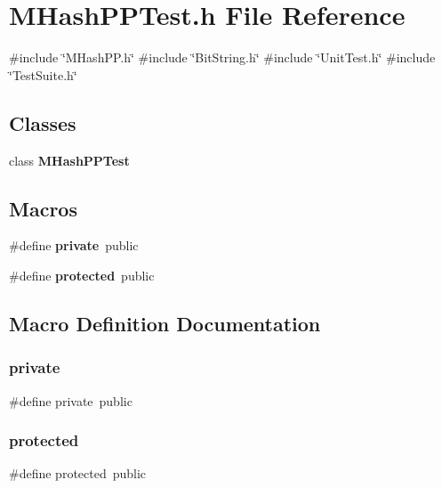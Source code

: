 \section{M\+Hash\+P\+P\+Test.\+h File Reference}
\label{MHashPPTest_8h}
{\ttfamily \#include \char`\"{}M\+Hash\+P\+P.\+h\char`\"{}}\newline
{\ttfamily \#include \char`\"{}Bit\+String.\+h\char`\"{}}\newline
{\ttfamily \#include \char`\"{}Unit\+Test.\+h\char`\"{}}\newline
{\ttfamily \#include \char`\"{}Test\+Suite.\+h\char`\"{}}\newline
\subsection*{Classes}
\begin{DoxyCompactItemize}
\item 
class \textbf{ M\+Hash\+P\+P\+Test}
\end{DoxyCompactItemize}
\subsection*{Macros}
\begin{DoxyCompactItemize}
\item 
\#define \textbf{ private}~public
\item 
\#define \textbf{ protected}~public
\end{DoxyCompactItemize}


\subsection{Macro Definition Documentation}
\mbox{\label{MHashPPTest_8h_a6a1d6e1a12975a4e9a0b5b952e79eaad}} 
\subsubsection{private}
{\footnotesize\ttfamily \#define private~public}

\mbox{\label{MHashPPTest_8h_a363c8dcebb1777654ad1703136a14ec8}} 
\subsubsection{protected}
{\footnotesize\ttfamily \#define protected~public}

